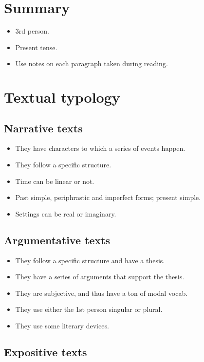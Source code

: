 \documentclass{article}
\begin{document}
\section*{Summary}

\begin{itemize}
    \item 3rd person.
    \item Present tense.
    \item Use notes on each paragraph taken during reading.
\end{itemize}

\section*{Textual typology}

\subsection*{Narrative texts}

\begin{itemize}
    \item They have characters to which a series of events happen.
    \item They follow a specific structure.
    \item Time can be linear or not.
    \item Past simple, periphrastic and imperfect forms; present simple.
    \item Settings can be real or imaginary.
\end{itemize}

\subsection*{Argumentative texts}

\begin{itemize}
    \item They follow a specific structure and have a thesis.
    \item They have a series of arguments that support the thesis.
    \item They are subjective, and thus have a ton of modal vocab.
    \item They use either the 1st person singular or plural.
    \item They use some literary devices.
\end{itemize}

\subsection*{Expositive texts}
\end{document}
